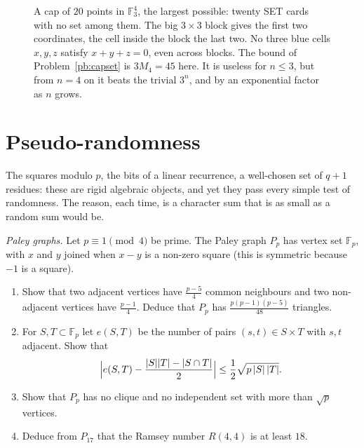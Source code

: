 \begin{figure}[ht]
\centering
{}
\caption{A cap of $20$ points in $\mathbb F_3^4$, the largest possible: twenty SET cards with no set among them. The big
$3\times3$ block gives the first two coordinates, the cell inside the block the last two. No three blue cells $x,y,z$
satisfy $x+y+z=0$, even across blocks. The bound of Problem~\ref{pb:capset} is $3M_4=45$ here. It is useless for $n\le3$, but from $n=4$ on it beats the
trivial $3^n$, and by an exponential factor as $n$ grows.}
\label{fig:cap}
\end{figure}

\section{Pseudo-randomness}

The squares modulo $p$, the bits of a linear recurrence, a well-chosen set of $q+1$ residues: these are rigid algebraic objects,
and yet they pass every simple test of randomness. The reason, each time, is a character sum that is as small as a random sum
would be.

\begin{exercise}[$\star\star$]\label{pb:paley}
\emph{Paley graphs.} Let $p\equiv1\pmod4$ be prime. The Paley graph $P_p$ has vertex set $\mathbb F_p$, with $x$ and $y$ joined
when $x-y$ is a non-zero square (this is symmetric because $-1$ is a square).
\begin{enumerate}[label=(\alph*)]
\item Show that two adjacent vertices have $\frac{p-5}4$ common neighbours and two non-adjacent vertices have $\frac{p-1}4$.
Deduce that $P_p$ has $\frac{p(p-1)(p-5)}{48}$ triangles.
\item For $S,T\subset\mathbb F_p$ let $e(S,T)$ be the number of pairs $(s,t)\in S\times T$ with $s,t$ adjacent. Show that
\[
\Bigl|e(S,T)-\frac{|S||T|-|S\cap T|}2\Bigr|\le\frac12\sqrt{p\,|S|\,|T|}.
\]
\item Show that $P_p$ has no clique and no independent set with more than $\sqrt p$ vertices.
\item Deduce from $P_{17}$ that the Ramsey number $R(4,4)$ is at least $18$.
\end{enumerate}
\end{exercise}

